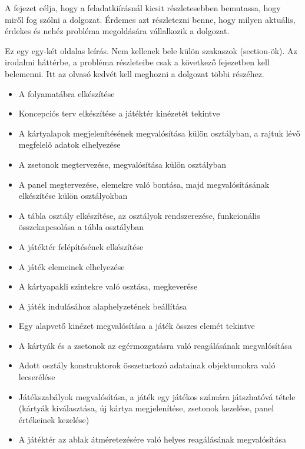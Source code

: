 
A fejezet célja, hogy a feladatkiírásnál kicsit részletesebben bemutassa, hogy miről fog szólni a dolgozat.
Érdemes azt részletezni benne, hogy milyen aktuális, érdekes és nehéz probléma megoldására vállalkozik a dolgozat.

Ez egy egy-két oldalas leírás.
Nem kellenek bele külön szakaszok (section-ök).
Az irodalmi háttérbe, a probléma részleteibe csak a következő fejezetben kell belemenni.
Itt az olvasó kedvét kell meghozni a dolgozat többi részéhez.

\newpage


\begin{itemize}
\item A folyamatábra elkészítése
\item Koncepciós terv elkészítése a játéktér kinézetét tekintve
\item A kártyalapok megjelenítésének megvalósítása külön osztályban, a rajtuk lévő megfelelő adatok elhelyezése
\item A zsetonok megtervezése, megvalósítása külön osztályban
\item A panel megtervezése, elemekre való bontása, majd megvalósításának elkészítése külön osztályokban
\item A tábla osztály elkészítése, az osztályok rendszerezése, funkcionális összekapcsolása a tábla osztályban
\item A játéktér felépítésének elkészítése
\item A játék elemeinek elhelyezése
\item A kártyapakli szintekre való osztása, megkeverése
\item A játék indulásához alaphelyzetének beállítása
\item Egy alapvető kinézet megvalósítása a játék összes elemét tekintve
\item A kártyák és a zsetonok az egérmozgatásra való reagálásának megvalósítása
\item Adott osztály konstruktorok összetartozó adatainak objektumokra való lecserélése
\item Játékszabályok megvalósítása, a játék egy játékos számára játszhatóvá tétele (kártyák kiválasztása, új kártya megjelenítése, zsetonok kezelése, panel értékeinek kezelése)
\item A játéktér az ablak átméretezésére való helyes reagálásának megvalósítása
\end{itemize}